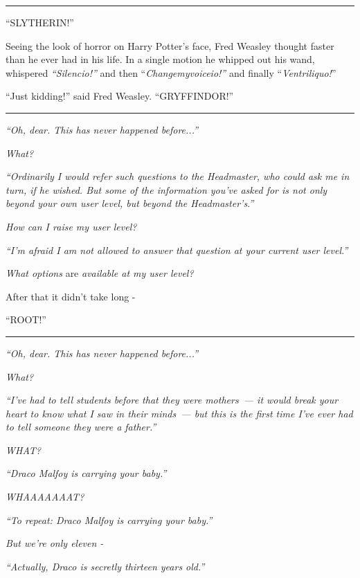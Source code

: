 \begin{center}\rule{3in}{0.4pt}\end{center}

``SLYTHERIN!''

Seeing the look of horror on Harry Potter's face, Fred Weasley thought faster than he ever had in his life. In a single motion he whipped out his wand, whispered \emph{``Silencio!''} and then ``\emph{Changemyvoiceio!''} and finally ``\emph{Ventriliquo!}''

``Just kidding!'' said Fred Weasley. ``GRYFFINDOR!''

\begin{center}\rule{3in}{0.4pt}\end{center}

\emph{``Oh, dear. This has never happened before...''}

\emph{What?}

\emph{``Ordinarily I would refer such questions to the Headmaster, who could ask me in turn, if he wished. But some of the information you've asked for is not only beyond your own user level, but beyond the Headmaster's.''}

\emph{How can I raise my user level?}

\emph{``I'm afraid I am not allowed to answer that question at your current user level.''}

\emph{What options} are \emph{available at my user level?}

After that it didn't take long -

``ROOT!''

\begin{center}\rule{3in}{0.4pt}\end{center}

\emph{``Oh, dear. This has never happened before...''}

\emph{What?}

\emph{``I've had to tell students before that they were mothers~--- it would break your heart to know what I saw in their minds~--- but this is the first time I've ever had to tell someone they were a father.''}

\emph{WHAT?}

\emph{``Draco Malfoy is carrying your baby.''}

\emph{WHAAAAAAAT?}

\emph{``To repeat: Draco Malfoy is carrying your baby.''}

\emph{But we're only eleven -}

\emph{``Actually, Draco is secretly thirteen years old.''}

